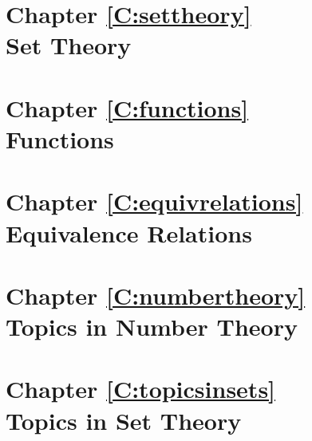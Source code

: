 \chapter*{Chapter \ref{C:settheory}\\Set Theory}








\chapter*{Chapter \ref{C:functions} \\Functions}







\chapter*{Chapter \ref{C:equivrelations} \\Equivalence Relations}





\chapter*{Chapter \ref{C:numbertheory} \\Topics in Number Theory}




\chapter*{Chapter \ref{C:topicsinsets} \\Topics in Set Theory}




\endinput
